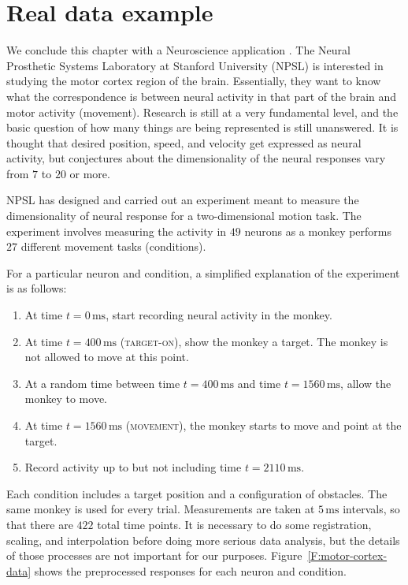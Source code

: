 \clearpage

\section{Real data example}

We conclude this chapter with a Neuroscience application . The Neural
Prosthetic Systems Laboratory at Stanford University (NPSL) is interested in
studying the motor cortex region of the brain. Essentially, they want to know
what the correspondence is between neural activity in that part of the brain
and motor activity (movement). Research is still at a very fundamental level,
and the basic question of how many things are being represented is still
unanswered. It is thought that desired position, speed, and velocity get
expressed as neural activity, but conjectures about the dimensionality of the
neural responses vary from $7$ to $20$ or more.

NPSL has designed and carried out an experiment meant to measure the 
dimensionality of neural response for a two-dimensional motion task.  The 
experiment involves measuring the activity in $49$ neurons as a monkey 
performs $27$ different movement tasks (conditions).

For a particular neuron and condition, a simplified explanation of the 
experiment is as follows:
\begin{enumerate}
    \item At time $t=0 \, \text{ms}$, start recording neural activity in the 
        monkey.
    \item At time $t=400 \, \text{ms}$ (\textsc{target-on}), show the monkey a 
        target.  The monkey is not allowed to move at this point.
    \item At a random time between time $t=400 \, \text{ms}$ and time 
        $t = 1560 \, \text{ms}$, allow the monkey to move.
    \item At time $t=1560 \, \text{ms}$ (\textsc{movement}), the monkey starts 
        to move and point at the target.
    \item Record activity up to but not including time $t=2110 \, \text{ms}$. 
\end{enumerate}
Each condition includes a target position and a configuration of obstacles. 
The same monkey is used for every trial.  Measurements are taken at 
$5 \, \text{ms}$ intervals, so that there are $422$ total time points.  It is 
necessary to do some registration, scaling, and interpolation before doing 
more serious data analysis, but the details of those processes are not 
important for our purposes.  Figure~\ref{F:motor-cortex-data} shows the 
preprocessed responses for each neuron and condition.

